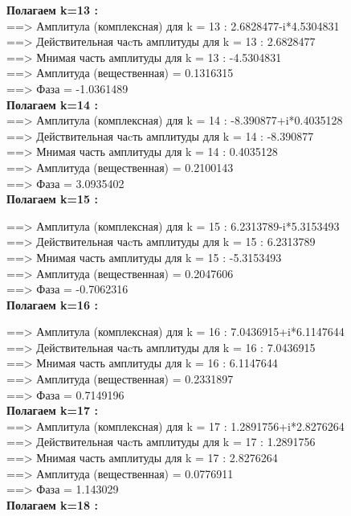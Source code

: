 \documentclass[a4paper,11pt]{article}
\begin{document}
\begin{flushleft}
\textbf{Полагаем k=13 :\\} 
 ==> Амплитула (комплексная) для k = 13 :  2.6828477-i*4.5304831\\ 
 ==> Действительная чаcть амплитуды  для k = 13 : 2.6828477\\ 
 ==> Мнимая часть амплитуды  для k = 13 : -4.5304831\\ 
 ==> Амплитуда (вещественная) = 0.1316315\\ 
 ==> Фаза = -1.0361489\\ 

\textbf{Полагаем k=14 :\\ }
 ==> Амплитула (комплексная) для k = 14 : -8.390877+i*0.4035128\\ 
 ==> Действительная чаcть амплитуды  для k = 14 : -8.390877\\ 
 ==> Мнимая часть амплитуды  для k = 14 : 0.4035128\\ 
 ==> Амплитуда (вещественная) = 0.2100143\\ 
 ==> Фаза = 3.0935402\\ 

\textbf{Полагаем k=15 :\\} 

 ==> Амплитула (комплексная) для k = 15 :  6.2313789-i*5.3153493\\ 
 ==> Действительная чаcть амплитуды  для k = 15 : 6.2313789\\ 
 ==> Мнимая часть амплитуды  для k = 15 : -5.3153493\\ 
 ==> Амплитуда (вещественная) = 0.2047606\\ 
 ==> Фаза = -0.7062316\\ 

\textbf{Полагаем k=16 :\\} 

 ==> Амплитула (комплексная) для k = 16 :  7.0436915+i*6.1147644\\ 
 ==> Действительная чаcть амплитуды  для k = 16 : 7.0436915\\ 
 ==> Мнимая часть амплитуды  для k = 16 : 6.1147644\\ 
 ==> Амплитуда (вещественная) = 0.2331897\\ 
 ==> Фаза = 0.7149196\\ 

\textbf{Полагаем k=17 :\\} 
 ==> Амплитула (комплексная) для k = 17 :  1.2891756+i*2.8276264\\ 
 ==> Действительная чаcть амплитуды  для k = 17 : 1.2891756\\ 
 ==> Мнимая часть амплитуды  для k = 17 : 2.8276264\\ 
 ==> Амплитуда (вещественная) = 0.0776911\\ 
 ==> Фаза = 1.143029\\ 
\textbf{Полагаем k=18 :\\ }


\end{flushleft}
\end{document}
